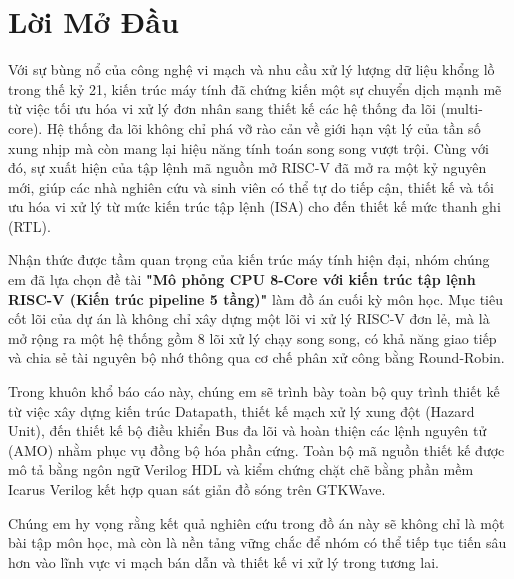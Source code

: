 \chapter*{Lời Mở Đầu}

Với sự bùng nổ của công nghệ vi mạch và nhu cầu xử lý lượng dữ liệu khổng lồ trong thế kỷ 21, kiến trúc máy tính đã chứng kiến một sự chuyển dịch mạnh mẽ từ việc tối ưu hóa vi xử lý đơn nhân sang thiết kế các hệ thống đa lõi (multi-core). Hệ thống đa lõi không chỉ phá vỡ rào cản về giới hạn vật lý của tần số xung nhịp mà còn mang lại hiệu năng tính toán song song vượt trội. Cùng với đó, sự xuất hiện của tập lệnh mã nguồn mở RISC-V đã mở ra một kỷ nguyên mới, giúp các nhà nghiên cứu và sinh viên có thể tự do tiếp cận, thiết kế và tối ưu hóa vi xử lý từ mức kiến trúc tập lệnh (ISA) cho đến thiết kế mức thanh ghi (RTL).

Nhận thức được tầm quan trọng của kiến trúc máy tính hiện đại, nhóm chúng em đã lựa chọn đề tài \textbf{"Mô phỏng CPU 8-Core với kiến trúc tập lệnh RISC-V (Kiến trúc pipeline 5 tầng)"} làm đồ án cuối kỳ môn học. Mục tiêu cốt lõi của dự án là không chỉ xây dựng một lõi vi xử lý RISC-V đơn lẻ, mà là mở rộng ra một hệ thống gồm 8 lõi xử lý chạy song song, có khả năng giao tiếp và chia sẻ tài nguyên bộ nhớ thông qua cơ chế phân xử công bằng Round-Robin.

Trong khuôn khổ báo cáo này, chúng em sẽ trình bày toàn bộ quy trình thiết kế từ việc xây dựng kiến trúc Datapath, thiết kế mạch xử lý xung đột (Hazard Unit), đến thiết kế bộ điều khiển Bus đa lõi và hoàn thiện các lệnh nguyên tử (AMO) nhằm phục vụ đồng bộ hóa phần cứng. Toàn bộ mã nguồn thiết kế được mô tả bằng ngôn ngữ Verilog HDL và kiểm chứng chặt chẽ bằng phần mềm Icarus Verilog kết hợp quan sát giản đồ sóng trên GTKWave.

Chúng em hy vọng rằng kết quả nghiên cứu trong đồ án này sẽ không chỉ là một bài tập môn học, mà còn là nền tảng vững chắc để nhóm có thể tiếp tục tiến sâu hơn vào lĩnh vực vi mạch bán dẫn và thiết kế vi xử lý trong tương lai.
